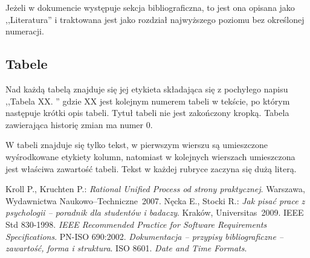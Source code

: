 \documentclass 	[11pt, a4paper, leqno]	{article}					%
\newcommand{\newoddside}{								%
	\ifthenelse{ \NOT \isodd{\thepage} } {
	    \newpage
	} {
	    \newpage
	    \newpage
	}
}
\begin{document}
Jeżeli w dokumencie występuje sekcja bibliograficzna, to jest ona opisana jako ,,Literatura'' i traktowana jest jako rozdział najwyższego poziomu bez określonej numeracji. 

\subsection{Tabele}
\noindent
Nad każdą tabelą znajduje się jej etykieta składająca się z pochyłego napisu ,,Tabela XX. '' gdzie XX jest kolejnym numerem tabeli w tekście, po którym następuje krótki opis tabeli. Tytuł tabeli nie jest zakończony kropką. Tabela zawierająca historię zmian ma numer 0.

W tabeli znajduje się tylko tekst, w pierwszym wierszu są umieszczone wyśrodkowane etykiety kolumn, natomiast w kolejnych wierszach umieszczona jest właściwa zawartość tabeli. Tekst w każdej rubryce zaczyna się dużą literą.

\newoddside
{}
\begin{thebibliography}{2}
	 Kroll P., Kruchten P.: \emph{Rational Unified Process od strony praktycznej}. Warszawa, Wydawnictwa Naukowo--Techniczne~2007.
	 Nęcka E., Stocki R.: \emph{Jak pisać prace z psychologii -- poradnik dla studentów i badaczy}. Kraków, Universitas~2009.
	 IEEE Std 830-1998. \emph{IEEE Recommended Practice for Software Requirements Specifications}.
	 PN-ISO 690:2002. \emph{Dokumentacja – przypisy bibliograficzne – zawartość, forma i struktura}.
	 ISO 8601. \emph{Date and Time Formats}.
\end{thebibliography}
\end{document}
